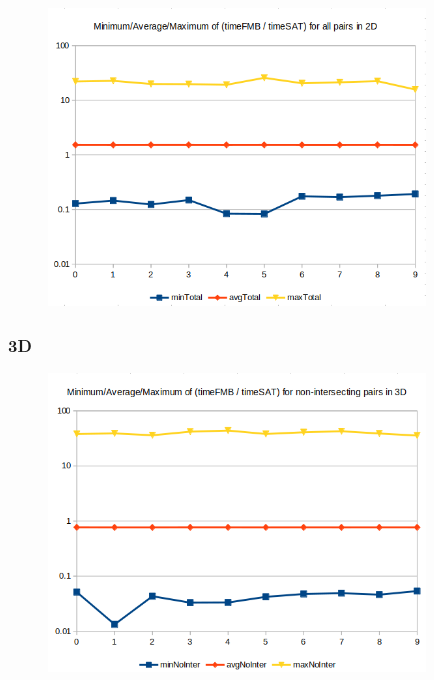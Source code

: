 \documentclass[12pt, a4paper]{article}
\begin{document}
\begin{center}
\begin{figure}[H]
\centering\includegraphics[width=10cm]{./2dtotal.png}\\
\end{figure}
\end{center}

\subsubsection{3D}

\begin{center}
\begin{figure}[H]
\centering\includegraphics[width=10cm]{./3dnointer.png}\\
\end{figure}
\end{center}
\end{document}
